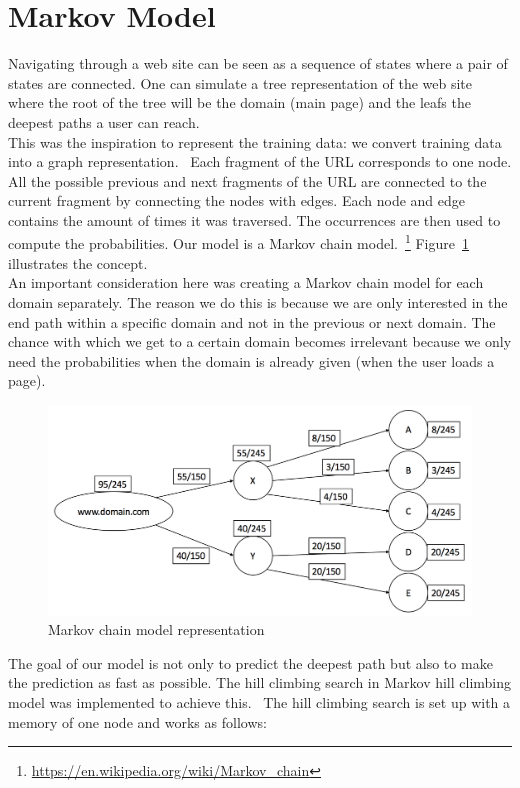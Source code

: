 \section{Markov Model}\label{sec:models}

Navigating through a web site can be seen as a sequence of states where a pair of states are connected. One can simulate a tree representation of the web site where the root of the tree will be the domain (main page) and the leafs the deepest paths a user can reach.
\\[2ex]
This was the inspiration to represent the training data: we convert training data into a graph representation.~\cite{article:markovmodel} Each fragment of the URL corresponds to one node. All the possible previous and next fragments of the URL are connected to the current fragment by connecting the nodes with edges. Each node and edge contains the amount of times it was traversed. The occurrences are then used to compute the probabilities. Our model is a Markov chain model.~\footnote{\url{https://en.wikipedia.org/wiki/Markov_chain}} Figure~\ref{fig:markov_chain} illustrates the concept.
\\[2ex]
An important consideration here was creating a Markov chain model for each domain separately. The reason we do this is because we are only interested in the end path within a specific domain and not in the previous or next domain. The chance with which we get to a certain domain becomes irrelevant because we only need the probabilities when the domain is already given (when the user loads a page).

\begin{figure}[!htp]
	\centering
	\includegraphics[width=\textwidth]{markov_chain}
	\caption{Markov chain model representation}\label{fig:markov_chain}
\end{figure}

The goal of our model is not only to predict the deepest path but also to make the prediction as fast as possible. The hill climbing search in Markov hill climbing model was implemented to achieve this.~\cite{lopez2008heuristic} The hill climbing search is set up with a memory of one node and works as follows:

